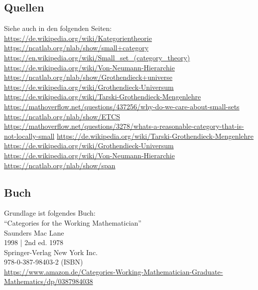 \documentclass[a4paper]{amsart}
\theoremstyle{definition}
\begin{document}
\subsection*{Quellen}
Siehe auch in den folgenden Seiten:\\
\url{https://de.wikipedia.org/wiki/Kategorientheorie}\\
\url{https://ncatlab.org/nlab/show/small+category}\\
\url{https://en.wikipedia.org/wiki/Small_set_(category_theory)}\\
\url{https://de.wikipedia.org/wiki/Von-Neumann-Hierarchie}\\
\url{https://ncatlab.org/nlab/show/Grothendieck+universe}\\
\url{https://de.wikipedia.org/wiki/Grothendieck-Universum}\\
\url{https://de.wikipedia.org/wiki/Tarski-Grothendieck-Mengenlehre}\\
\url{https://mathoverflow.net/questions/437256/why-do-we-care-about-small-sets}\\
\url{https://ncatlab.org/nlab/show/ETCS}\\
\url{https://mathoverflow.net/questions/3278/whats-a-reasonable-category-that-is-not-locally-small}
\url{https://de.wikipedia.org/wiki/Tarski-Grothendieck-Mengenlehre}\\
\url{https://de.wikipedia.org/wiki/Grothendieck-Universum}\\
\url{https://de.wikipedia.org/wiki/Von-Neumann-Hierarchie}\\
\url{https://ncatlab.org/nlab/show/span}

\subsection*{Buch}
Grundlage ist folgendes Buch:\\
"`Categories for the Working Mathematician"'\\
Saunders Mac Lane\\
1998 | 2nd ed. 1978\\
Springer-Verlag New York Inc.\\
978-0-387-98403-2 (ISBN)\\
{\tiny
   \url{https://www.amazon.de/Categories-Working-Mathematician-Graduate-Mathematics/dp/0387984038}}\\
\end{document}
